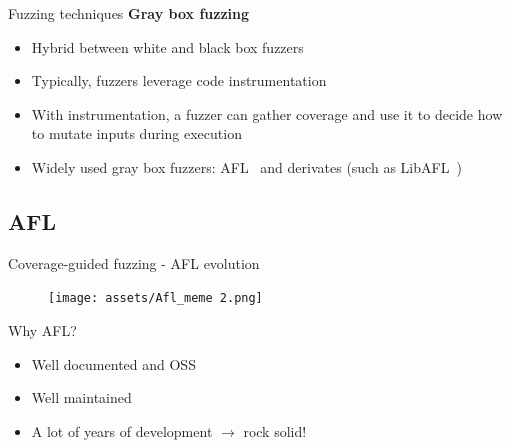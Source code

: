 \documentclass[xcolor=dvipsnames, 12pt]{beamer}
\begin{document}
\begin{frame}{Fuzzing techniques}
        \textbf{Gray box fuzzing}
        \begin{itemize}
                \item Hybrid between white and black box fuzzers
                \item Typically, fuzzers leverage code instrumentation
                \item With instrumentation, a fuzzer can gather coverage and use it to decide how to mutate inputs during execution
                \item Widely used gray box fuzzers: AFL~\cite{AFLplusplus-Woot20} and derivates (such as LibAFL~\cite{libafl})
        \end{itemize}
\end{frame}

\begin{NoHyper}
\begin{frame}
        \section{AFL}
        \sectionpage
\end{frame}
\end{NoHyper}

\begin{frame}{Coverage-guided fuzzing - AFL evolution}
        \begin{figure}
                \begin{center}
                        \texttt{[image: assets/Afl\_meme 2.png]}
                \end{center}
        \end{figure}
\end{frame}

\begin{frame}{Why AFL?}
        \begin{itemize}
                \item Well documented and OSS
                \item Well maintained
                \item A lot of years of development $\rightarrow$ rock solid!
        \end{itemize}
\end{frame}
\end{document}
